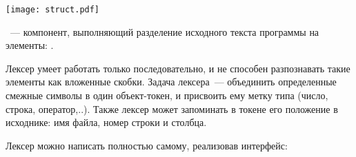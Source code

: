 \texttt{[image: struct.pdf]}

\secdown


\ --- компонент, выполняющий разделение исходного 
текста программы на элементы: .

\bigskip
Лексер умеет работать только последовательно, и не способен разпознавать такие
элементы как вложенные скобки. Задача лексера\ --- объединить определенные
смежные символы в один объект-токен, и присвоить ему метку типа (число, строка, 
оператор,..). Также лексер может запоминать в токене его положение в 
исходнике: имя файла, номер строки и столбца.

Лексер можно написать полностью самому, реализовав интерфейс:



\secup

\clearpage
{}
\printindex

